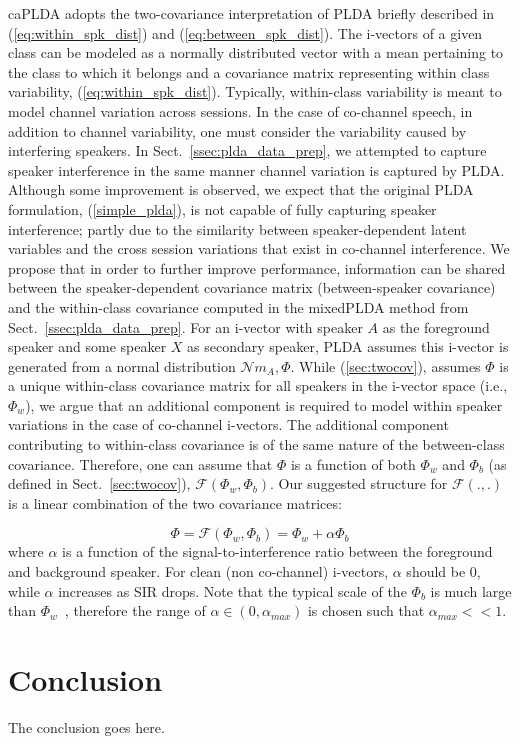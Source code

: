 \documentclass[journal]{IEEEtran}
\begin{document}
caPLDA adopts the two-covariance interpretation of PLDA briefly described in (\ref{eq:within_spk_dist}) and (\ref{eq:between_spk_dist}). 
The i-vectors of a given class can be modeled as a normally distributed vector with a mean pertaining to the class to which it belongs and a covariance matrix representing within class variability, (\ref{eq:within_spk_dist}). 
Typically, within-class variability is meant to model channel variation across sessions. 
In the case of co-channel speech, in addition to channel variability, one must consider the variability caused by interfering speakers. 
In Sect.~\ref{ssec:plda_data_prep}, we attempted to capture speaker interference in the same manner channel variation is captured by PLDA. 
Although some improvement is observed, we expect that the original PLDA formulation, (\ref{simple_plda}), is not capable of fully capturing speaker interference; partly due to the similarity between speaker-dependent latent variables and the cross session variations that exist in co-channel interference. 
We propose that in order to further improve performance, information can be shared between the speaker-dependent covariance matrix (between-speaker covariance) and the within-class covariance computed in the mixedPLDA method from Sect.~\ref{ssec:plda_data_prep}. 
For an i-vector with speaker $A$ as the foreground speaker and some speaker $X$ as secondary speaker, PLDA assumes this i-vector is generated from a normal distribution $\mathcal{N} {m_A,\Phi}$. 
While (\ref{sec:twocov}), assumes $\Phi$ is a unique within-class covariance matrix for all speakers in the i-vector space (i.e., $\Phi_w$), we argue that an additional component is required to model within speaker variations in the case of co-channel i-vectors. 
The additional component contributing to within-class covariance is of the same nature of the between-class covariance. 
Therefore, one can assume that $\Phi$ is a function of both $\Phi_w$ and $\Phi_b$ (as defined in Sect.~\ref{sec:twocov}), $ \mathcal{F} (\Phi_w,\Phi_b)$. 
Our suggested structure for $ \mathcal{F} (.,.)$ is a linear combination of the two covariance matrices: 

\begin{equation}
\Phi = \mathcal{F} (\Phi_w,\Phi_b) = 
\Phi_w + \alpha\Phi_b
\end{equation}
where $\alpha$ is a function of the signal-to-interference ratio between the foreground and background speaker. 
For clean (non co-channel) i-vectors, $\alpha$ should be $0$, while $\alpha$ increases as SIR drops. 
Note that the typical scale of the $\Phi_b$ is much large than $\Phi_w$~\cite{glembek2014wccLDA}, therefore the range of $\alpha \in (0,\alpha_{max})$ is chosen such that $\alpha_{max} << 1$.


\section{Conclusion}
The conclusion goes here.





\ifCLASSOPTIONcaptionsoff
  \newpage
\fi



\end{document}
